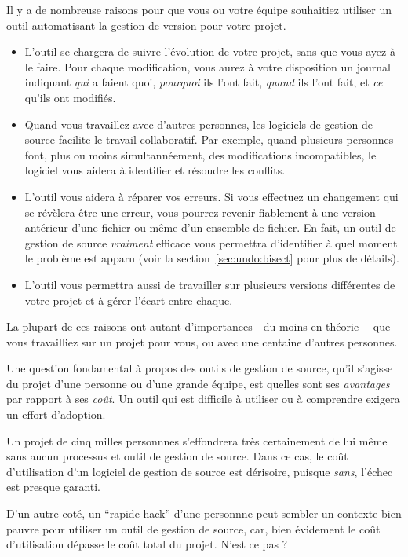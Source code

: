 Il y a de nombreuse raisons pour que vous ou votre équipe souhaitiez
utiliser un outil automatisant la gestion de version pour votre projet.
\begin{itemize}
\item L'outil se chargera de suivre l'évolution de votre projet, sans
que vous ayez à le faire. Pour chaque modification, vous aurez à votre
disposition un journal indiquant \emph{qui} a faient quoi, \emph{pourquoi}
ils l'ont fait, \emph{quand} ils l'ont fait, et \emph{ce} qu'ils ont
modifiés.
\item Quand vous travaillez avec d'autres personnes, les logiciels de 
gestion de source facilite le travail collaboratif. Par exemple, quand
plusieurs personnes font, plus ou moins simultannéement, des modifications
incompatibles, le logiciel vous aidera à identifier et résoudre les conflits.
\item L'outil vous aidera à réparer vos erreurs. Si vous effectuez un changement
qui se révèlera être une erreur, vous pourrez revenir fiablement à une version
antérieur d'une fichier ou même d'un ensemble de fichier. En fait, un outil de
gestion de source \emph{vraiment} efficace vous permettra d'identifier à quel
moment le problème est apparu (voir la section~\ref{sec:undo:bisect} pour plus
de détails).
\item L'outil vous permettra aussi de travailler sur plusieurs versions différentes
de votre projet et à gérer l'écart entre chaque.
\end{itemize}
La plupart de ces raisons ont autant d'importances---du moins en théorie--- que
vous travailliez sur un projet pour vous, ou avec une centaine d'autres
personnes.

Une question fondamental à propos des outils de gestion de source, qu'il s'agisse
du projet d'une personne ou d'une grande équipe, est quelles sont ses  
\emph{avantages} par rapport à ses \emph{coût}. Un outil qui est difficile à 
utiliser ou à comprendre exigera un effort d'adoption.

Un projet de cinq milles personnnes s'effondrera très certainement de lui même
sans aucun processus et outil de gestion de source. Dans ce cas, le coût 
d'utilisation d'un logiciel de gestion de source est dérisoire, puisque 
\emph{sans}, l'échec est presque garanti.

D'un autre coté, un ``rapide hack'' d'une personnne peut sembler un contexte
bien pauvre pour utiliser un outil de gestion de source, car, bien évidement
le coût d'utilisation dépasse le coût total du projet. N'est ce pas ?

